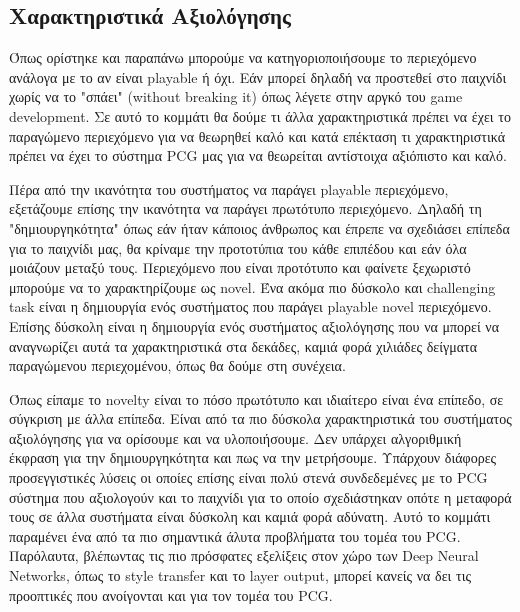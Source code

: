 \subsection{Χαρακτηριστικά Αξιολόγησης}
Όπως ορίστηκε και παραπάνω μπορούμε να κατηγοριοποιήσουμε το περιεχόμενο ανάλογα με το αν είναι playable ή όχι. Εάν μπορεί δηλαδή να προστεθεί στο παιχνίδι χωρίς να το "σπάει" (without breaking it) όπως λέγετε στην αργκό του game development. Σε αυτό το κομμάτι θα δούμε τι άλλα χαρακτηριστικά πρέπει να έχει το παραγώμενο περιεχόμενο για να θεωρηθεί καλό και κατά επέκταση τι χαρακτηριστικά πρέπει να έχει το σύστημα PCG μας για να θεωρείται αντίστοιχα αξιόπιστο και καλό.
\par
Πέρα από την ικανότητα του συστήματος να παράγει playable περιεχόμενο, εξετάζουμε επίσης την ικανότητα να παράγει πρωτότυπο περιεχόμενο. Δηλαδή τη "δημιουργηκότητα" όπως εάν ήταν κάποιος άνθρωπος και έπρεπε να σχεδιάσει επίπεδα για το παιχνίδι μας, θα κρίναμε την προτοτύπια του κάθε επιπέδου και εάν όλα μοιάζουν μεταξύ τους. Περιεχόμενο που είναι προτότυπο και φαίνετε ξεχωριστό μπορούμε να το χαρακτηρίζουμε ως novel. Ένα ακόμα πιο δύσκολο και challenging task είναι η δημιουργία ενός συστήματος που παράγει playable  novel περιεχόμενο. Επίσης δύσκολη είναι η δημιουργία ενός συστήματος αξιολόγησης που να μπορεί να αναγνωρίζει αυτά τα χαρακτηριστικά στα δεκάδες, καμιά φορά χιλιάδες δείγματα παραγώμενου περιεχομένου, όπως θα δούμε στη συνέχεια.
\par
Όπως είπαμε το novelty είναι το πόσο πρωτότυπο και ιδιαίτερο είναι ένα επίπεδο, σε σύγκριση με άλλα επίπεδα. Είναι από τα πιο δύσκολα χαρακτηριστικά του συστήματος αξιολόγησης για να ορίσουμε και να υλοποιήσουμε. Δεν υπάρχει αλγοριθμική έκφραση για την δημιουργηκότητα και πως να την μετρήσουμε. Υπάρχουν διάφορες προσεγγιστικές λύσεις οι οποίες επίσης είναι πολύ στενά συνδεδεμένες με το PCG σύστημα που αξιολογούν και το παιχνίδι για το οποίο σχεδιάστηκαν οπότε η μεταφορά τους σε άλλα συστήματα είναι δύσκολη και καμιά φορά αδύνατη. Αυτό το κομμάτι παραμένει ένα από τα πιο σημαντικά άλυτα προβλήματα του τομέα του PCG. Παρόλαυτα, βλέπωντας τις πιο πρόσφατες εξελίξεις στον χώρο των Deep Neural Networks, όπως το style transfer και το layer output, μπορεί κανείς να δει τις προοπτικές που ανοίγονται και για τον τομέα του PCG.
\par
